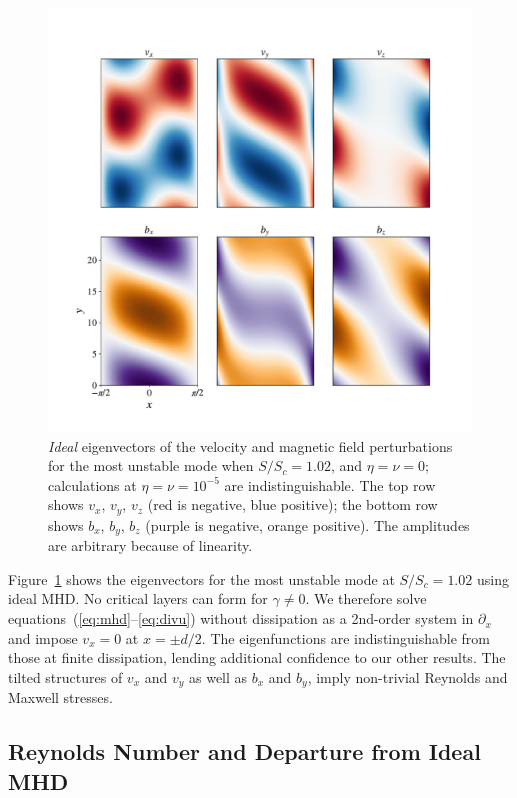 \documentclass{rsproca_new}%
\newcommand{\SSC}{S/S_{c}}
\begin{document}
\begin{figure}[h!]
  \centering
  \includegraphics[width=\columnwidth]{eigvecs_xy_run_11_ideal_single_mode.pdf}
  \caption{\textit{Ideal} eigenvectors of the velocity and magnetic field perturbations for the most unstable mode when $\SSC=1.02$, and $\eta=\nu=0$; calculations at $\eta=\nu=10^{-5}$ are indistinguishable.
  The top row shows $v_{x}$, $v_{y}$, $v_{z}$ (red is negative, blue positive); the bottom row shows $b_{x}$, $b_{y}$, $b_{z}$ (purple is negative, orange positive). 
The amplitudes are arbitrary because of linearity.}
  \label{fig:eigvec}
\end{figure}

Figure~\ref{fig:eigvec} shows the eigenvectors for the most unstable mode at $\SSC=1.02$ using ideal MHD. 
No critical layers can form for $\gamma\ne0$.
We therefore solve equations~(\ref{eq:mhd}--\ref{eq:divu}) without dissipation as a 2nd-order system in $\partial_{x}$ and impose $v_{x}=0$ at $x=\pm{d/2}$.
The eigenfunctions are indistinguishable from those at finite dissipation, lending additional confidence to our other results.
The tilted structures of $v_{x}$ and $v_{y}$ as well as $b_{x}$ and $b_{y}$, imply non-trivial Reynolds and Maxwell stresses.

\subsection{Reynolds Number and Departure from Ideal MHD}
\label{sec:reyn}
\end{document}
